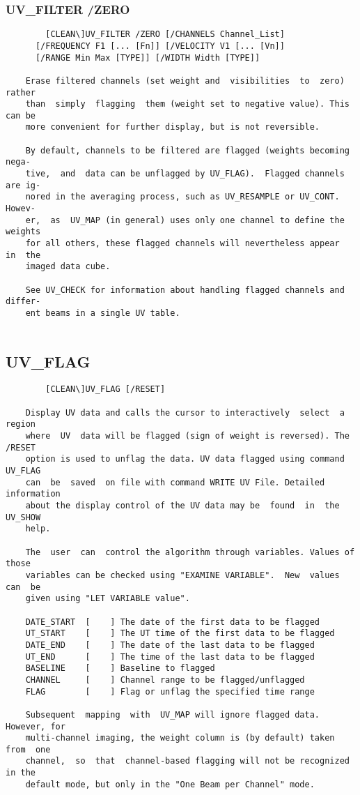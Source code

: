 \subsubsection{UV\_FILTER /ZERO}
\begin{verbatim}
        [CLEAN\]UV_FILTER /ZERO [/CHANNELS Channel_List]
      [/FREQUENCY F1 [... [Fn]] [/VELOCITY V1 [... [Vn]]
      [/RANGE Min Max [TYPE]] [/WIDTH Width [TYPE]]

    Erase filtered channels (set weight and  visibilities  to  zero)  rather
    than  simply  flagging  them (weight set to negative value). This can be
    more convenient for further display, but is not reversible.

    By default, channels to be filtered are flagged (weights becoming  nega-
    tive,  and  data can be unflagged by UV_FLAG).  Flagged channels are ig-
    nored in the averaging process, such as UV_RESAMPLE or UV_CONT.   Howev-
    er,  as  UV_MAP (in general) uses only one channel to define the weights
    for all others, these flagged channels will nevertheless appear  in  the
    imaged data cube.

    See UV_CHECK for information about handling flagged channels and differ-
    ent beams in a single UV table.


\end{verbatim}
\subsection{UV\_FLAG}
\begin{verbatim}
        [CLEAN\]UV_FLAG [/RESET]

    Display UV data and calls the cursor to interactively  select  a  region
    where  UV  data will be flagged (sign of weight is reversed). The /RESET
    option is used to unflag the data. UV data flagged using command UV_FLAG
    can  be  saved  on file with command WRITE UV File. Detailed information
    about the display control of the UV data may be  found  in  the  UV_SHOW
    help.

    The  user  can  control the algorithm through variables. Values of those
    variables can be checked using "EXAMINE VARIABLE".  New  values  can  be
    given using "LET VARIABLE value".

    DATE_START  [    ] The date of the first data to be flagged
    UT_START    [    ] The UT time of the first data to be flagged
    DATE_END    [    ] The date of the last data to be flagged
    UT_END      [    ] The time of the last data to be flagged
    BASELINE    [    ] Baseline to flagged
    CHANNEL     [    ] Channel range to be flagged/unflagged
    FLAG        [    ] Flag or unflag the specified time range

    Subsequent  mapping  with  UV_MAP will ignore flagged data. However, for
    multi-channel imaging, the weight column is (by default) taken from  one
    channel,  so  that  channel-based flagging will not be recognized in the
    default mode, but only in the "One Beam per Channel" mode.

\end{verbatim}
